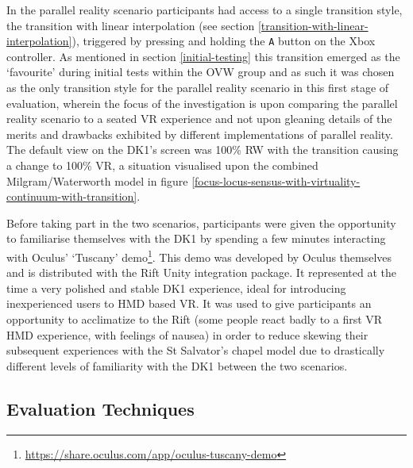 In the parallel reality scenario participants had access to a single transition style, the transition with linear interpolation (see section \ref{transition-with-linear-interpolation}), triggered by pressing and holding the \texttt{A} button on the Xbox controller. As mentioned in section \ref{initial-testing} this transition emerged as the `favourite' during initial tests within the OVW group and as such it was chosen as the only transition style for the parallel reality scenario in this first stage of evaluation, wherein the focus of the investigation is upon comparing the parallel reality scenario to a seated VR experience and not upon gleaning details of the merits and drawbacks exhibited by different implementations of parallel reality. The default view on the DK1's screen was 100\% RW with the transition causing a change to 100\% VR, a situation visualised upon the combined Milgram/Waterworth model in figure \ref{focus-locus-sensus-with-virtuality-continuum-with-transition}.

Before taking part in the two scenarios, participants were given the opportunity to familiarise themselves with the DK1 by spending a few minutes interacting with Oculus' `Tuscany' demo\footnote{\url{https://share.oculus.com/app/oculus-tuscany-demo}}. This demo was developed by Oculus themselves and is distributed with the Rift Unity integration package. It represented at the time a very polished and stable DK1 experience, ideal for introducing inexperienced users to HMD based VR. It was used to give participants an opportunity to acclimatize to the Rift (some people react badly to a first VR HMD experience, with feelings of nausea) in order to reduce skewing their subsequent experiences with the St Salvator's chapel model due to drastically different levels of familiarity with the DK1 between the two scenarios.


\subsection{Evaluation Techniques}

